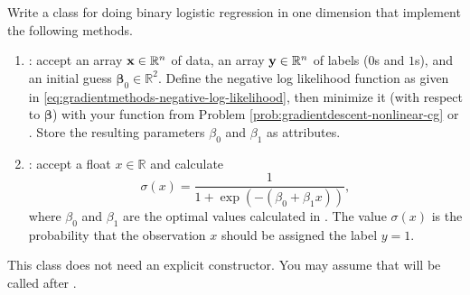 \begin{problem}{}{}
Write a class for doing binary logistic regression in one dimension that implement the following methods.
\begin{enumerate}
\item {}: accept an array $\mathbf{x}\in\mathbb{R}^n$ of data, an array $\mathbf{y}\in\mathbb{R}^n$ of labels ($0$s and $1$s), and an initial guess $\boldsymbol{\beta}_0\in\mathbb{R}^2$.
Define the negative log likelihood function as given in \eqref{eq:gradientmethods-negative-log-likelihood}, then minimize it (with respect to $\boldsymbol{\beta}$) with your function from Problem \ref{prob:gradientdescent-nonlinear-cg} or .
Store the resulting parameters $\beta_0$ and $\beta_1$ as attributes.

\item {}: accept a float $x\in\mathbb{R}$ and calculate
\[\sigma(x) = \frac{1}{1 + \exp(- (\beta_0 + \beta_1 x))},\]
where $\beta_0$ and $\beta_1$ are the optimal values calculated in .
The value $\sigma(x)$ is the probability that the observation $x$ should be assigned the label $y=1$.
\end{enumerate}
This class does not need an explicit constructor.
You may assume that  will be called after .
\label{prob:gradientmethods-logistic-regression}
\end{problem}

